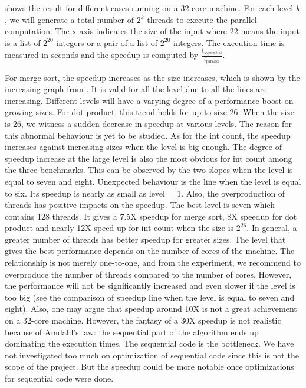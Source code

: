  shows the result for different cases running on a 32-core machine. For each level $k$, we will generate a total number of $2^k$ threads to execute the parallel computation. The x-axis indicates the size of the input where 22 means the input is a list of $2^20$ integers or a pair of a list of $2^20$ integers. The execution time is measured in seconds and the speedup is computed by $\frac{t_{\text{sequential}}}{t_\text{parallel}}$. 

For merge sort, the speedup increases as the size increases, which is shown by the increasing graph from . It is valid for all the level due to all the lines are increasing. Different levels will have a varying degree of a performance boost on growing sizes. For dot product, this trend holds for up to size 26. When the size is 26, we witness a sudden decrease in speedup at various levels. The reason for this abnormal behaviour is yet to be studied. As for the int count, the speedup increases against increasing sizes when the level is big enough. The degree of speedup increase at the large level is also the most obvious for int count among the three benchmarks. This can be observed by the two slopes when the level is equal to seven and eight. Unexpected behaviour is the line when the level is equal to six. Its speedup is nearly as small as level = 1. Also, the overproduction of threads has positive impacts on the speedup. The best level is seven which contains 128 threads. It gives a 7.5X speedup for merge sort, 8X speedup for dot product and nearly 12X speed up for int count when the size is $2^{26}$. In general, a greater number of threads has better speedup for greater sizes. The level that gives the best performance depends on the number of cores of the machine. The relationship is not merely one-to-one, and from the experiment, we recommend to overproduce the number of threads compared to the number of cores. However, the performance will not be significantly increased and even slower if the level is too big (see the comparison of speedup line when the level is equal to seven and eight). Also, one may argue that speedup around 10X is not a great achievement on a 32-core machine. However, the fantasy of a 30X speedup is not realistic because of Amdahl's law: the sequential part of the algorithm ends
up dominating the execution times. The sequential code is the bottleneck. We have not investigated too much on optimization of sequential code since this is not the scope of the project. But the speedup could be more notable once optimizations for sequential code were done.